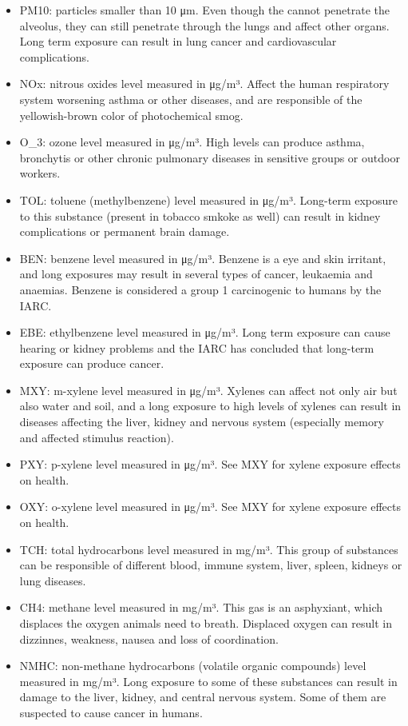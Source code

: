 \documentclass[
]{article}
\begin{document}
\begin{itemize}
\item
  PM10: particles smaller than 10 μm. Even though the cannot penetrate
  the alveolus, they can still penetrate through the lungs and affect
  other organs. Long term exposure can result in lung cancer and
  cardiovascular complications.
\item
  NOx: nitrous oxides level measured in μg/m³. Affect the human
  respiratory system worsening asthma or other diseases, and are
  responsible of the yellowish-brown color of photochemical smog.
\item
  O\_3: ozone level measured in μg/m³. High levels can produce asthma,
  bronchytis or other chronic pulmonary diseases in sensitive groups or
  outdoor workers.
\item
  TOL: toluene (methylbenzene) level measured in μg/m³. Long-term
  exposure to this substance (present in tobacco smkoke as well) can
  result in kidney complications or permanent brain damage.
\item
  BEN: benzene level measured in μg/m³. Benzene is a eye and skin
  irritant, and long exposures may result in several types of cancer,
  leukaemia and anaemias. Benzene is considered a group 1 carcinogenic
  to humans by the IARC.
\item
  EBE: ethylbenzene level measured in μg/m³. Long term exposure can
  cause hearing or kidney problems and the IARC has concluded that
  long-term exposure can produce cancer.
\item
  MXY: m-xylene level measured in μg/m³. Xylenes can affect not only air
  but also water and soil, and a long exposure to high levels of xylenes
  can result in diseases affecting the liver, kidney and nervous system
  (especially memory and affected stimulus reaction).
\item
  PXY: p-xylene level measured in μg/m³. See MXY for xylene exposure
  effects on health.
\item
  OXY: o-xylene level measured in μg/m³. See MXY for xylene exposure
  effects on health.
\item
  TCH: total hydrocarbons level measured in mg/m³. This group of
  substances can be responsible of different blood, immune system,
  liver, spleen, kidneys or lung diseases.
\item
  CH4: methane level measured in mg/m³. This gas is an asphyxiant, which
  displaces the oxygen animals need to breath. Displaced oxygen can
  result in dizzinnes, weakness, nausea and loss of coordination.
\item
  NMHC: non-methane hydrocarbons (volatile organic compounds) level
  measured in mg/m³. Long exposure to some of these substances can
  result in damage to the liver, kidney, and central nervous system.
  Some of them are suspected to cause cancer in humans.
\end{itemize}
\end{document}

